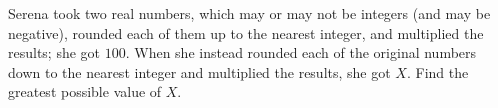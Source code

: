 Serena took two real numbers, which may or may not be integers (and may be negative), rounded each of them up to the nearest integer, and multiplied the results; she got $100$. When she instead rounded each of the original numbers down to the nearest integer and multiplied the results, she got $X$. Find the greatest possible value of $X$.
